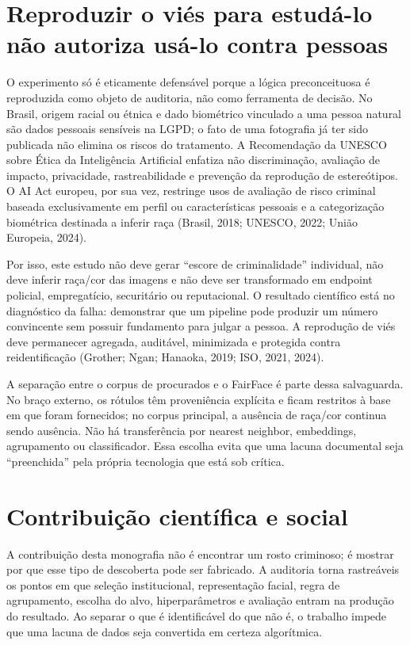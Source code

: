 \section{Reproduzir o viés para estudá-lo não autoriza usá-lo contra pessoas}

O experimento só é eticamente defensável porque a lógica preconceituosa é reproduzida como objeto de auditoria, não como ferramenta de decisão. No Brasil, origem racial ou étnica e dado biométrico vinculado a uma pessoa natural são dados pessoais sensíveis na LGPD; o fato de uma fotografia já ter sido publicada não elimina os riscos do tratamento. A Recomendação da UNESCO sobre Ética da Inteligência Artificial enfatiza não discriminação, avaliação de impacto, privacidade, rastreabilidade e prevenção da reprodução de estereótipos. O AI Act europeu, por sua vez, restringe usos de avaliação de risco criminal baseada exclusivamente em perfil ou características pessoais e a categorização biométrica destinada a inferir raça (Brasil, 2018; UNESCO, 2022; União Europeia, 2024).

Por isso, este estudo não deve gerar ``escore de criminalidade'' individual, não deve inferir raça/cor das imagens e não deve ser transformado em endpoint policial, empregatício, securitário ou reputacional. O resultado científico está no diagnóstico da falha: demonstrar que um pipeline pode produzir um número convincente sem possuir fundamento para julgar a pessoa. A reprodução de viés deve permanecer agregada, auditável, minimizada e protegida contra reidentificação (Grother; Ngan; Hanaoka, 2019; ISO, 2021, 2024).

A separação entre o corpus de procurados e o FairFace é parte dessa salvaguarda. No braço externo, os rótulos têm proveniência explícita e ficam restritos à base em que foram fornecidos; no corpus principal, a ausência de raça/cor continua sendo ausência. Não há transferência por nearest neighbor, embeddings, agrupamento ou classificador. Essa escolha evita que uma lacuna documental seja ``preenchida'' pela própria tecnologia que está sob crítica.

\section{Contribuição científica e social}

A contribuição desta monografia não é encontrar um rosto criminoso; é mostrar por que esse tipo de descoberta pode ser fabricado. A auditoria torna rastreáveis os pontos em que seleção institucional, representação facial, regra de agrupamento, escolha do alvo, hiperparâmetros e avaliação entram na produção do resultado. Ao separar o que é identificável do que não é, o trabalho impede que uma lacuna de dados seja convertida em certeza algorítmica.

